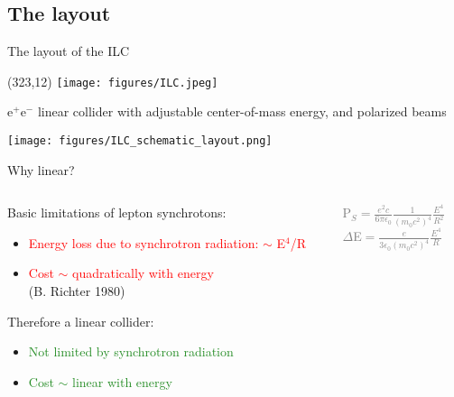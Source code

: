 \documentclass[xcolor={dvipsnames}]{beamer}
\newcommand{\ilclogo}{
  \setlength{\TPHorizModule}{1pt}
  \setlength{\TPVertModule}{1pt}
  \begin{textblock}{1}(323,12)
   \texttt{[image: figures/ILC.jpeg]}
  \end{textblock}
}
\begin{document}
\subsection{The layout}
\begin{frame}{The layout of the ILC}
\ilclogo

e$^+$e$^-$ linear collider with adjustable center-of-mass energy, and polarized beams\\
\begin{center}
\texttt{[image: figures/ILC\_schematic\_layout.png]}
\end{center}
\end{frame}

\begin{frame}{Why linear?}
\begin{columns}
 \begin{column}{0.6\textwidth}
  Basic limitations of lepton synchrotons:
\begin{itemize}
 \item \textcolor{Red}{Energy loss due to synchrotron radiation: $\sim$ E$^4$/R}
 \item \textcolor{Red}{Cost $\sim$ quadratically with energy}\\ \tiny{(B. Richter 
1980)}
\end{itemize}
\vspace*{1cm}
Therefore a linear collider:
\begin{itemize}
 \item \textcolor{ForestGreen}{Not limited by synchrotron radiation}
 \item \textcolor{ForestGreen}{Cost $\sim$ linear with energy}
\end{itemize}
 \end{column}
 \begin{column}{0.4\textwidth}
 \begin{block}{}
  \begin{center}
      \textcolor{Gray}{P$_S=\frac{e^2c}{6\pi\epsilon_0}\frac{1}{(m_0c^2)^4}\frac{E^4}{R^2}$\\
  $\Delta$E$=\frac{e}{3\epsilon_0(m_0c^2)^4}\frac{E^4}{R}$}
   \end{center}
 \end{block}
 \end{column}
\end{columns}

\end{frame}

\end{document}
